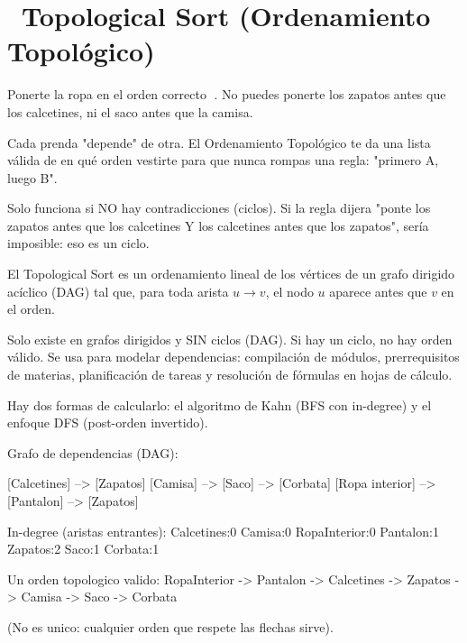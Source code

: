 \chapter[\emj{📑}~Topological Sort (Ordenamiento Topológico)]{~Topological Sort (Ordenamiento Topológico)}

\begin{dsaquees}

Ponerte la ropa en el orden correcto 👕. No puedes ponerte los zapatos
antes que los calcetines, ni el saco antes que la camisa.

Cada prenda "depende" de otra. El Ordenamiento Topológico te da una
lista válida de en qué orden vestirte para que nunca rompas una regla:
"primero A, luego B".

Solo funciona si NO hay contradicciones (ciclos). Si la regla dijera
"ponte los zapatos antes que los calcetines Y los calcetines antes que
los zapatos", sería imposible: eso es un ciclo.

\end{dsaquees}

\begin{dsaotraforma}

El Topological Sort es un ordenamiento lineal de los vértices de un
grafo dirigido acíclico (DAG) tal que, para toda arista $u \to v$, el
nodo $u$ aparece antes que $v$ en el orden.

Solo existe en grafos dirigidos y SIN ciclos (DAG). Si hay un ciclo,
no hay orden válido. Se usa para modelar dependencias: compilación de
módulos, prerrequisitos de materias, planificación de tareas y
resolución de fórmulas en hojas de cálculo.

Hay dos formas de calcularlo: el algoritmo de Kahn (BFS con in-degree)
y el enfoque DFS (post-orden invertido).

\end{dsaotraforma}

\begin{dsadiagrama}
Grafo de dependencias (DAG):

  [Calcetines] --> [Zapatos]
  [Camisa] --> [Saco] --> [Corbata]
  [Ropa interior] --> [Pantalon] --> [Zapatos]

In-degree (aristas entrantes):
  Calcetines:0  Camisa:0  RopaInterior:0
  Pantalon:1  Zapatos:2  Saco:1  Corbata:1

Un orden topologico valido:
  RopaInterior -> Pantalon -> Calcetines -> Zapatos
  -> Camisa -> Saco -> Corbata

(No es unico: cualquier orden que respete las flechas sirve).
\end{dsadiagrama}


